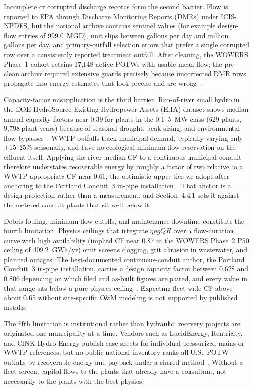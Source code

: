 \documentclass[12pt,letterpaper]{report}
\begin{document}
Incomplete or corrupted discharge records form the second barrier. Flow is reported to
EPA through Discharge Monitoring Reports (DMRs) under ICIS-NPDES, but the national archive
contains sentinel values (for example design-flow entries of 999.0~MGD), unit slips between
gallons per day and million gallons per day, and primary-outfall selection errors that
prefer a single corrupted row over a consistently reported treatment outfall. After
cleaning, the WOWERS Phase~1 cohort retains 17,148 active POTWs with usable mean flow; the
pre-clean archive required extensive guards precisely because uncorrected DMR rows
propagate into energy estimates that look precise and are wrong~\cite{epa_echo}.

Capacity-factor misapplication is the third barrier. Run-of-river small hydro in the DOE
HydroSource Existing Hydropower Assets (EHA) dataset shows median annual capacity factors
near 0.39 for plants in the 0.1--5~MW class (629 plants, 9,798 plant-years) because of
seasonal drought, peak sizing, and environmental-flow bypasses~\cite{hydrosource_eha}.
WWTP outfalls track municipal demand, typically varying only $\pm$15--25\% seasonally, and
have no ecological minimum-flow reservation on the effluent itself. Applying the river
median CF to a continuous municipal conduit therefore understates recoverable energy by
roughly a factor of two relative to a WWTP-appropriate CF near 0.60, the
optimistic upper tier we adopt after anchoring to the Portland Conduit~3 in-pipe
installation~\cite{ferc_p14498, lucidpipe}. That anchor is a design projection
rather than a measurement, and Section~4.4.1 sets it against the metered conduit
plants that sit well below it.

Debris fouling, minimum-flow cutoffs, and maintenance downtime constitute the fourth
limitation. Physics ceilings that integrate $\eta\rho g Q H$ over a flow-duration curve
with high availability (implied CF near 0.87 in the WOWERS Phase~2 P50 ceiling of
409.2~GWh/yr) omit screens clogging, grit abrasion in wastewater, and planned outages.
The best-documented continuous-conduit anchor, the Portland Conduit~3 in-pipe
installation, carries a design capacity factor between 0.628 and 0.806 depending on which
filed and as-built figures are paired, and every value in that range sits below a pure
physics ceiling~\cite{ferc_p14498, lucidpipe}. Expecting
fleet-wide CF above about 0.65 without site-specific O\&M modeling is not supported by
published installs.

The fifth limitation is institutional rather than hydraulic: recovery projects are
originated one municipality at a time. Vendors such as LucidEnergy, Rentricity, and CINK
Hydro-Energy publish case sheets for individual pressurized mains or WWTP references, but
no public national inventory ranks all U.S.\ POTW outfalls by recoverable energy and
payback under a shared method~\cite{rentricity,cink}. Without a fleet screen, capital
flows to the plants that already have a consultant, not necessarily to the plants with the
best physics.
\end{document}
